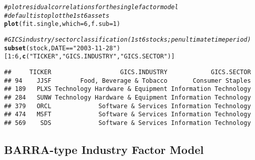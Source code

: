 \documentclass[a4paper]{article}\usepackage[]{graphicx}\usepackage[]{color}
\makeatletter
\newcommand{\hlnum}[1]{\textcolor[rgb]{0.686,0.059,0.569}{#1}}%
\newcommand{\hlstr}[1]{\textcolor[rgb]{0.192,0.494,0.8}{#1}}%
\newcommand{\hlcom}[1]{\textcolor[rgb]{0.678,0.584,0.686}{\textit{#1}}}%
\newcommand{\hlopt}[1]{\textcolor[rgb]{0,0,0}{#1}}%
\newcommand{\hlstd}[1]{\textcolor[rgb]{0.345,0.345,0.345}{#1}}%
\newcommand{\hlkwc}[1]{\textcolor[rgb]{0.333,0.667,0.333}{#1}}%
\newcommand{\hlkwd}[1]{\textcolor[rgb]{0.737,0.353,0.396}{\textbf{#1}}}%
\newenvironment{kframe}{%
 \def\at@end@of@kframe{}%
 \ifinner\ifhmode%
  \def\at@end@of@kframe{\end{minipage}}%
  \begin{minipage}{\columnwidth}%
 \fi\fi%
 \def\FrameCommand##1{\hskip\@totalleftmargin \hskip-\fboxsep
 \colorbox{shadecolor}{##1}\hskip-\fboxsep
     \hskip-\linewidth \hskip-\@totalleftmargin \hskip\columnwidth}%
 \MakeFramed {\advance\hsize-\width
   \@totalleftmargin\z@ \linewidth\hsize
   \@setminipage}}%
 {\par\unskip\endMakeFramed%
 \at@end@of@kframe}
\newenvironment{knitrout}{}{} %
\makeatother
\begin{document}
\begin{knitrout}
\color{fgcolor}\begin{kframe}
\begin{alltt}
\hlcom{# plot residual correlations for the single factor model}
\hlcom{# default is to plot the 1st 6 assets}
\hlkwd{plot}\hlstd{(fit.single,} \hlkwc{which}\hlstd{=}\hlnum{6}\hlstd{,} \hlkwc{f.sub}\hlstd{=}\hlnum{1}\hlstd{)}
\end{alltt}


{\ttfamily\noindent\bfseries\color{errorcolor}{\#\# Error in h(simpleError(msg, call)): error in evaluating the argument 'x' in selecting a method for function 'plot': object 'fit.single' not found}}\begin{alltt}
\hlcom{# GICS industry/sector classification (1st 6 stocks; penultimate time period)}
\hlkwd{subset}\hlstd{(stock,DATE}\hlopt{==}\hlstr{"2003-11-28"}\hlstd{)[}\hlnum{1}\hlopt{:}\hlnum{6}\hlstd{,}\hlkwd{c}\hlstd{(}\hlstr{"TICKER"}\hlstd{,}\hlstr{"GICS.INDUSTRY"}\hlstd{,}\hlstr{"GICS.SECTOR"}\hlstd{)]}
\end{alltt}
\begin{verbatim}
##     TICKER                   GICS.INDUSTRY            GICS.SECTOR
## 94    JJSF        Food, Beverage & Tobacco       Consumer Staples
## 189   PLXS Technology Hardware & Equipment Information Technology
## 284   SUNW Technology Hardware & Equipment Information Technology
## 379   ORCL             Software & Services Information Technology
## 474   MSFT             Software & Services Information Technology
## 569    SDS             Software & Services Information Technology
\end{verbatim}
\end{kframe}
\end{knitrout}

\newpage
\subsection{BARRA-type Industry Factor Model}
\end{document}
